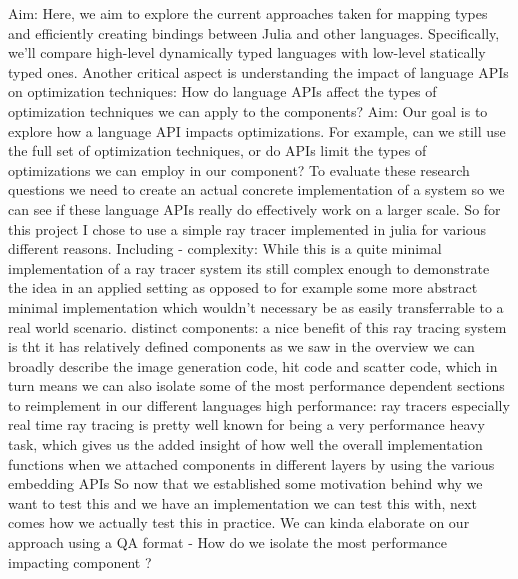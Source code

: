 {}Aim: Here, we aim to explore the current approaches taken for mapping types and efficiently creating bindings between Julia and other languages. Specifically, we'll compare high-level dynamically typed languages with low-level statically typed ones.\markdownRendererInterblockSeparator
{}Another critical aspect is understanding the impact of language APIs on optimization techniques:\markdownRendererInterblockSeparator
{}How do language APIs affect the types of optimization techniques we can apply to the components?\markdownRendererInterblockSeparator
{}Aim: Our goal is to explore how a language API impacts optimizations. For example, can we still use the full set of optimization techniques, or do APIs limit the types of optimizations we can employ in our component?\markdownRendererInterblockSeparator
{}\markdownRendererInterblockSeparator
{}To evaluate these research questions we need to create an actual concrete implementation of a system so we can see if these language APIs really do effectively work on a larger scale. \markdownRendererInterblockSeparator
{}So for this project I chose to use a simple ray tracer implemented in julia for various different reasons. Including - complexity: While this is a quite minimal implementation of a ray tracer system its still complex enough to demonstrate the idea in an applied setting as opposed to for example some more abstract minimal implementation which wouldn't necessary be as easily transferrable to a real world scenario. \markdownRendererInterblockSeparator
{}\markdownRendererUlBegin
\markdownRendererUlItem distinct components: a nice benefit of this ray tracing system is tht it has relatively defined components as we saw in the overview we can broadly describe the image generation code, hit code and scatter code, which in turn means we can also isolate some of the most performance dependent sections to reimplement in our different languages \markdownRendererUlItemEnd 
\markdownRendererUlItem high performance: ray tracers especially real time ray tracing is pretty well known for being a very performance heavy task, which gives us the added insight of how well the overall implementation functions when we attached components in different layers by using the various embedding APIs\markdownRendererUlItemEnd 
\markdownRendererUlEnd \markdownRendererInterblockSeparator
{}\markdownRendererInterblockSeparator
{}So now that we established some motivation behind why we want to test this and we have an implementation we can test this with, next comes how we actually test this in practice. We can kinda elaborate on our approach using a Q\markdownRendererAmpersand{}A format - How do we isolate the most performance impacting component ?\markdownRendererInterblockSeparator

